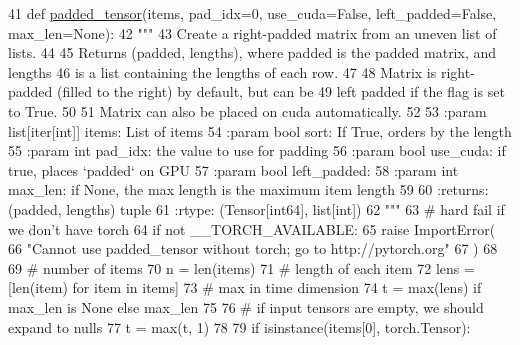 \begin{DoxyCode}
41 \textcolor{keyword}{def }\hyperlink{namespaceparlai_1_1agents_1_1legacy__agents_1_1seq2seq_1_1utils__v1_adb5a414ae439f14c54e8c760b91cc4c8}{padded\_tensor}(items, pad\_idx=0, use\_cuda=False, left\_padded=False, max\_len=None):
42     \textcolor{stringliteral}{"""}
43 \textcolor{stringliteral}{    Create a right-padded matrix from an uneven list of lists.}
44 \textcolor{stringliteral}{}
45 \textcolor{stringliteral}{    Returns (padded, lengths), where padded is the padded matrix, and lengths}
46 \textcolor{stringliteral}{    is a list containing the lengths of each row.}
47 \textcolor{stringliteral}{}
48 \textcolor{stringliteral}{    Matrix is right-padded (filled to the right) by default, but can be}
49 \textcolor{stringliteral}{    left padded if the flag is set to True.}
50 \textcolor{stringliteral}{}
51 \textcolor{stringliteral}{    Matrix can also be placed on cuda automatically.}
52 \textcolor{stringliteral}{}
53 \textcolor{stringliteral}{    :param list[iter[int]] items: List of items}
54 \textcolor{stringliteral}{    :param bool sort: If True, orders by the length}
55 \textcolor{stringliteral}{    :param int pad\_idx: the value to use for padding}
56 \textcolor{stringliteral}{    :param bool use\_cuda: if true, places `padded` on GPU}
57 \textcolor{stringliteral}{    :param bool left\_padded:}
58 \textcolor{stringliteral}{    :param int max\_len: if None, the max length is the maximum item length}
59 \textcolor{stringliteral}{}
60 \textcolor{stringliteral}{    :returns: (padded, lengths) tuple}
61 \textcolor{stringliteral}{    :rtype: (Tensor[int64], list[int])}
62 \textcolor{stringliteral}{    """}
63     \textcolor{comment}{# hard fail if we don't have torch}
64     \textcolor{keywordflow}{if} \textcolor{keywordflow}{not} \_\_TORCH\_AVAILABLE:
65         \textcolor{keywordflow}{raise} ImportError(
66             \textcolor{stringliteral}{"Cannot use padded\_tensor without torch; go to http://pytorch.org"}
67         )
68 
69     \textcolor{comment}{# number of items}
70     n = len(items)
71     \textcolor{comment}{# length of each item}
72     lens = [len(item) \textcolor{keywordflow}{for} item \textcolor{keywordflow}{in} items]
73     \textcolor{comment}{# max in time dimension}
74     t = max(lens) \textcolor{keywordflow}{if} max\_len \textcolor{keywordflow}{is} \textcolor{keywordtype}{None} \textcolor{keywordflow}{else} max\_len
75 
76     \textcolor{comment}{# if input tensors are empty, we should expand to nulls}
77     t = max(t, 1)
78 
79     \textcolor{keywordflow}{if} isinstance(items[0], torch.Tensor):

\end{DoxyCode}
